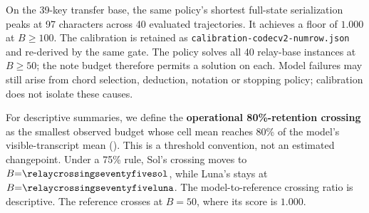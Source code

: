 On the 39-key transfer base, the same policy's shortest full-state serialization peaks at 97 characters across 40 evaluated trajectories. It achieves a floor of $1.000$ at $B \geq 100$. The calibration is retained as \texttt{calibration-codecv2-numrow.json} and re-derived by the same gate. The policy solves all 40 relay-base instances at $B \geq 50$; the note budget therefore permits a solution on each. Model failures may still arise from chord selection, deduction, notation or stopping policy; calibration does not isolate these causes.

For descriptive summaries, we define the \textbf{operational 80\%-retention crossing} as the smallest observed budget whose cell mean reaches 80\% of the model's visible-transcript mean (). This is a threshold convention, not an estimated changepoint. Under a 75\% rule, Sol's crossing moves to $B{=}\relaycrossingseventyfivesol$, while Luna's stays at $B{=}\relaycrossingseventyfiveluna$. The model-to-reference crossing ratio is descriptive. The reference crosses at $B{=}50$, where its score is $1.000$.
